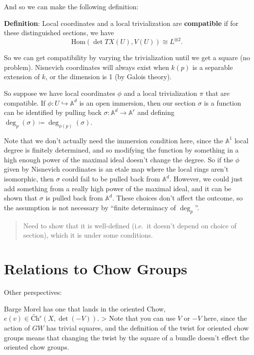 \documentclass[11pt]{scrreprt}
\theoremstyle{definition}
\newcommand{\Af}[0]{{\mathbb{A}}}
\newcommand{\tensor}[0]{\otimes}
\newcommand{\definedas}[0]{\coloneqq}
\newcommand{\injects}[0]{\hookrightarrow}
\renewcommand{\hom}[0]{\text{Hom}}
\begin{document}
And so we can make the following definition:

\textbf{Definition}: Local coordinates and a local trivialization are
\textbf{compatible} if for these distinguished sections, we have \[
\hom(\det TX(U), V(U)) \cong L^{\tensor 2}.
\]

So we can get compatibility by varying the trivialization until we get a
square (no problem). Nisnevich coordinates will always exist when
\(k(p)\) is a separable extension of \(k\), or the dimension is 1 (by
Galois theory).

So suppose we have local coordinates \(\phi\) and a local trivialization
\(\pi\) that are compatible. If \(\phi: U \injects \Af^d\) is an open
immersion, then our section \(\sigma\) is a function can be identified
by pulling back \(\sigma: \Af^d \to \Af^r\) and defining
\(\deg_p(\sigma) \definedas \deg_{\phi(p)}(\sigma)\).

Note that we don't actually need the immersion condition here, since the
\(\Af^1\) local degree is finitely determined, and so modifying the
function by something in a high enough power of the maximal ideal
doesn't change the degree. So if the \(\phi\) given by Nisnevich
coordinates is an etale map where the local rings aren't isomorphic,
then \(\sigma\) could fail to be pulled back from \(\Af^d\). However, we
could just add something from a really high power of the maximal ideal,
and it can be shown that \(\sigma\) is pulled back from \(\Af^d\). These
choices don't affect the outcome, so the assumption is not necessary by
``finite determinacy of \(\deg_p\)''.

\begin{quote}
Need to show that it is well-defined (i.e.~it doesn't depend on choice
of section), which it is under some conditions.
\end{quote}

\hypertarget{relations-to-chow-groups}{%
\section{Relations to Chow Groups}\label{relations-to-chow-groups}}

Other perspectives:

Barge Morel has one that lands in the oriented Chow,
\(e(v) \in \widetilde{\text{Ch}}{}^r(X, \det (-V))\). \textgreater{}
Note that you can use \(V\) or \(-V\) here, since the action of \(GW\)
has trivial squares, and the definition of the twist for oriented chow
groups means that changing the twist by the square of a bundle doesn't
effect the oriented chow groups.
\end{document}
